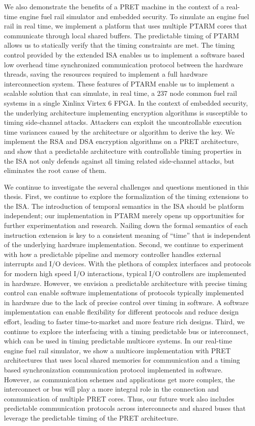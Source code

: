 We also demonstrate the benefits of a PRET machine in the context of a real-time engine fuel rail simulator and embedded security.
To simulate an engine fuel rail in real time, we implement a platform that uses multiple PTARM cores that communicate through local shared buffers. 
The predictable timing of PTARM allows us to statically verify that the timing constraints are met.  
The timing control provided by the extended ISA enables us to implement a software based low overhead time synchronized communication protocol between the hardware threads, saving the resources required to implement a full hardware interconnection system.
These features of PTARM enable us to implement a scalable solution that can simulate, in real time, a 237 node common fuel rail systems in a single Xinlinx Virtex 6 FPGA. 
In the context of embedded security, the underlying architecture implementing encryption algorithms is susceptible to timing side-channel attacks.
Attackers can exploit the uncontrollable execution time variances caused by the architecture or algorithm to derive the key. 
We implement the RSA and DSA encryption algorithms on a PRET architecture, and show that a predictable architecture with controllable timing properties in the ISA not only defends against all timing related side-channel attacks, but eliminates the root cause of them. 

We continue to investigate the several challenges and questions mentioned in this thesis.
First, we continue to explore the formalization of the timing extensions to the ISA. 
The introduction of temporal semantics in the ISA should be platform independent; our implementation in PTARM merely opens up opportunities for further experimentation and research. 
Nailing down the formal semantics of each instruction extension is key to a consistent meaning of ``time'' that is independent of the underlying hardware implementation. 
Second, we continue to experiment with how a predictable pipeline and memory controller handles external interrupts and I/O devices.     
With the plethora of complex interfaces and protocols for modern high speed I/O interactions, typical I/O controllers are implemented in hardware.
However, we envision a predictable architecture with precise timing control can enable software implementations of protocols typically implemented in hardware due to the lack of precise control over timing in software.
A software implementation can enable flexibility for different protocols and reduce design effort, leading to faster time-to-market and more feature rich designs.        
Third, we continue to explore the interfacing with a timing predictable bus or interconnect, which can be used in timing predictable multicore systems.
In our real-time engine fuel rail simulator, we show a multicore implementation with PRET architectures that uses local shared memories for communication and  a timing based synchronization communication protocol implemented in software.  
However, as communication schemes and applications get more complex, the interconnect or bus will play a more integral role in the connection and communication of multiple PRET cores.
Thus, our future work also includes predictable communication protocols across interconnects and shared buses that leverage the predictable timing of the PRET architecture.     

